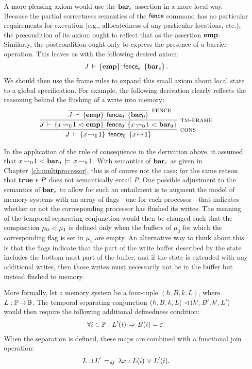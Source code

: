 \documentclass[11pt]{report}
\begin{document}
A more pleasing axiom would use the $\mathbf{bar}_{e}$ assertion in a more local way. Because the partial correctness semantics of the $\operatorname{\mathsf{fence}}$ command has no particular requirements for execution (e.g., allocatedness of any particular locations, etc.), the precondition of its axiom ought to reflect that as the assertion $\mathbf{emp}$. Similarly, the postcondition ought only to express the presence of a barrier operation. This leaves us with the following desired axiom: \[ J\,\vdash\,\left\lbrace \mathbf{emp} \right\rbrace\;\operatorname{\mathsf{fence}}_e\;\left\lbrace \mathbf{bar}_{e} \right\rbrace.\] We should then use the frame rules to expand this small axiom about local state to a global specification. For example, the following derivation clearly reflects the reasoning behind the flushing of a write into memory: \[ \infer[\textsc{cons}]{\spec{J}{x \fwrite{0} 1}{\cfence_0}{x \fpointsto 1}}{\infer[\textsc{tm-frame}]{\spec{J}{x \fwrite{0} 1 \fseq \femp}{\cfence_0}{x \fwrite{0} 1 \fseq \fbar{0}}}{\infer[\textsc{fence}]{\spec{J}{\femp}{\cfence_0}{\fbar{0}}}{}}}\]

In the application of the rule of consequence in the derivation above, it assumed that $x \!\leadsto_{0}\! 1 \operatorname{\,\vartriangleleft\,} \mathbf{bar}_{0} \,\models\, x \!\leadsto_{0}\! 1$. With semantics of $\mathbf{bar}_{e}$ as given in Chapter~\ref{ch:multiprocessor}, this is of course not the case; for the same reason that $\mathbf{true} \operatorname{\,\ast\,} P$ does not semantically entail $P$. One possible adjustment to the semantics of $\mathbf{bar}_{e}$ to allow for such an entailment is to augment the model of memory systems with an array of flags---one for each processor---that indicates whether or not the corresponding processor has flushed its writes. The meaning of the temporal separating conjunction would then be changed such that the composition $\mu_0 \operatorname{\,\vartriangleleft\,} \mu_1$ is defined only when the buffers of $\mu_0$ for which the corresponding flag is set in $\mu_1$ are empty. An alternative way to think about this is that the flags indicate that the part of the write buffer described by the state includes the bottom-most part of the buffer; and if the state is extended with any additional writes, then those writes must necessarily not be in the buffer but instead flushed to memory. 

More formally, let a memory system be a four-tuple $(h,B,k,L)$, where $L : \mathbb{P} \operatorname{\rightarrow} \mathbb{B}$. The temporal separating conjunction $(h,B,k,L) \operatorname{\,\vartriangleleft\,} (h',B',k',L')$ would then require the following additional definedness condition: \[ \forall i \in \mathbb{P} \operatorname{\,:\,} L'(i) \operatorname{\,\Rightarrow\,} B(i) = \varepsilon.\] When the separation is defined, these maps are combined with a functional join operation: \[ L \sqcup L' \operatorname{\;=_{\mathit{df}}\;} \lambda x \operatorname{\,:\,} L(i) \operatorname{\,\vee\,} L'(i).\]
\end{document}
